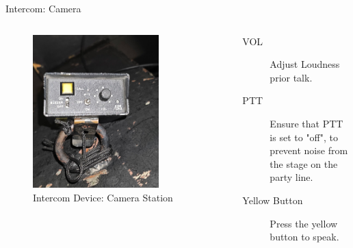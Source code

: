 \documentclass[aspectratio=169]{beamer}
\begin{document}
\begin{frame}{Intercom: Camera }
	\begin{columns}[T,onlytextwidth]
		\begin{figure} 
			\centering
			\includegraphics[width=0.75\textwidth]{images/intercom-camera.png}
			\caption{Intercom Device: Camera Station}
		\end{figure}

		\begin{description}
			\item[VOL] Adjust Loudness prior talk.
			\item[PTT] Ensure that PTT is set to "off", to prevent noise from the stage on the party line.
			\item[Yellow Button] Press the yellow button to speak.
		\end{description}
	\end{columns}
\end{frame}
\end{document}
